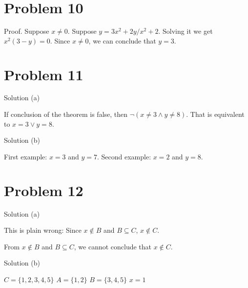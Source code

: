 \documentclass{article}
\begin{document}
\section{Problem 10}

Proof. Suppose $x \neq 0$. Suppose $y = 3x^2 + 2y / x^2 + 2$. Solving
it we get $x^2(3 - y) = 0$. Since $x \neq 0$, we can conclude that $y
= 3$.

\section{Problem 11}

Solution (a)

If conclusion of the theorem is false, then $\neg( x \neq 3 \land y
\neq 8)$. That is equivalent to $x = 3 \lor y = 8$.

Solution (b)

First example: $x = 3$ and $y = 7$.
Second example: $x = 2$ and $y = 8$.

\section{Problem 12}

Solution (a)

This is plain wrong: Since $x \notin B$ and $B \subseteq C$, $x \notin
C$.

From $x \notin B$ and $B \subseteq C$, we cannot conclude that $x
\notin C$.

Solution (b)

$ C = \{1,2,3,4,5\} $
$ A = \{1,2\}$
$ B = \{3,4,5\}$
$ x = 1 $
\end{document}
